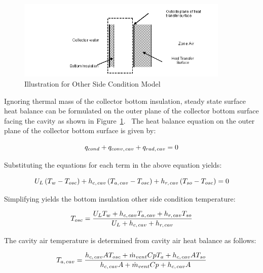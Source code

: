 \begin{figure}[hbtp] %
\centering
\includegraphics[width=0.9\textwidth, height=0.9\textheight, keepaspectratio=true]{media/image6527.png}
\caption{Illustration for Other Side Condition Model \protect \label{fig:illustration-for-other-side-condition-model}}
\end{figure}

Ignoring thermal mass of the collector bottom insulation, steady state surface heat balance can be formulated on the outer plane of the collector bottom surface facing the cavity as shown in Figure~\ref{fig:illustration-for-other-side-condition-model}.~ The heat balance equation on the outer plane of the collector bottom surface is given by:

\begin{equation}
{q_{cond}} + {q_{conv,{\kern 1pt} cav}} + {q_{rad,{\kern 1pt} cav}} = 0
\end{equation}

Substituting the equations for each term in the above equation yields:

\begin{equation}
U_L \left( T_w - T_{osc} \right) + h_{c,{\kern 1pt} cav} \left( T_{a,{\kern 1pt} cav} - T_{osc} \right) + h_{r,{\kern 1pt} cav} \left( T_{so} - T_{osc} \right) = 0
\end{equation}

Simplifying yields the bottom insulation other side condition temperature:

\begin{equation}
{T_{osc}} = \frac{{{U_L}{T_w} + {h_{c,{\kern 1pt} cav}}{T_{a,{\kern 1pt} cav}} + {h_{r,{\kern 1pt} cav}}{T_{so}}}}{{{U_L} + {h_{c,{\kern 1pt} cav}} + {h_{r,{\kern 1pt} cav}}}}
\end{equation}

The cavity air temperature is determined from cavity air heat balance as follows:

\begin{equation}
{T_{a,{\kern 1pt} cav}} = \frac{{{h_{c,{\kern 1pt} cav}}A{T_{osc}} + {{\dot m}_{vent}}Cp{T_a} + {h_{c,{\kern 1pt} cav}}A{T_{so}}}}{{{h_{c,{\kern 1pt} cav}}A + {{\dot m}_{vent}}Cp + {h_{c,{\kern 1pt} cav}}A}}
\end{equation}

